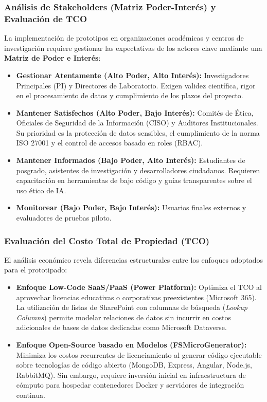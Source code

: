 \subsubsection{Análisis de Stakeholders (Matriz Poder-Interés) y Evaluación de TCO}

La implementación de prototipos en organizaciones académicas y centros de investigación requiere gestionar las expectativas de los actores clave mediante una \textbf{Matriz de Poder e Interés}:

\begin{itemize}
    \item \textbf{Gestionar Atentamente (Alto Poder, Alto Interés):} Investigadores Principales (PI) y Directores de Laboratorio. Exigen validez científica, rigor en el procesamiento de datos y cumplimiento de los plazos del proyecto.
    \item \textbf{Mantener Satisfechos (Alto Poder, Bajo Interés):} Comités de Ética, Oficiales de Seguridad de la Información (CISO) y Auditores Institucionales. Su prioridad es la protección de datos sensibles, el cumplimiento de la norma ISO 27001 y el control de accesos basado en roles (RBAC).
    \item \textbf{Mantener Informados (Bajo Poder, Alto Interés):} Estudiantes de posgrado, asistentes de investigación y desarrolladores ciudadanos. Requieren capacitación en herramientas de bajo código y guías transparentes sobre el uso ético de IA.
    \item \textbf{Monitorear (Bajo Poder, Bajo Interés):} Usuarios finales externos y evaluadores de pruebas piloto.
\end{itemize}

\subsubsection{Evaluación del Costo Total de Propiedad (TCO)}

El análisis económico revela diferencias estructurales entre los enfoques adoptados para el prototipado:

\begin{itemize}
    \item \textbf{Enfoque Low-Code SaaS/PaaS (Power Platform):} Optimiza el TCO al aprovechar licencias educativas o corporativas preexistentes (Microsoft 365). La utilización de listas de SharePoint con columnas de búsqueda (\textit{Lookup Columns}) permite modelar relaciones de datos sin incurrir en costos adicionales de bases de datos dedicadas como Microsoft Dataverse.
    \item \textbf{Enfoque Open-Source basado en Modelos (FSMicroGenerator):} Minimiza los costos recurrentes de licenciamiento al generar código ejecutable sobre tecnologías de código abierto (MongoDB, Express, Angular, Node.js, RabbitMQ). Sin embargo, requiere inversión inicial en infraestructura de cómputo para hospedar contenedores Docker y servidores de integración continua.
\end{itemize}

